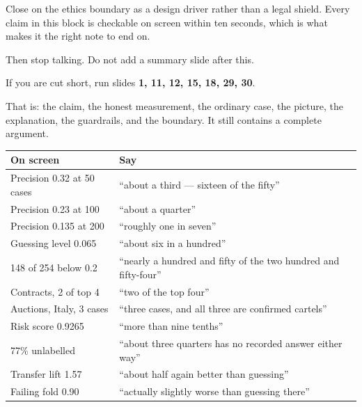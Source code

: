 \documentclass[11pt]{article}
\begin{document}
\begin{means}
Close on the ethics boundary as a design driver rather than a legal shield.
Every claim in this block is checkable on screen within ten seconds, which is
what makes it the right note to end on.

Then stop talking. Do not add a summary slide after this.
\end{means}



If you are cut short, run slides \textbf{1, 11, 12, 15, 18, 29, 30}.

That is: the claim, the honest measurement, the ordinary case, the picture, the
explanation, the guardrails, and the boundary. It still contains a complete
argument.


\begin{center}\small
\begin{tabular}{@{}p{6.2cm}p{8.4cm}@{}}
\hline
\textbf{On screen} & \textbf{Say} \\
\hline
Precision 0.32 at 50 cases & ``about a third --- sixteen of the fifty'' \\
Precision 0.23 at 100 & ``about a quarter'' \\
Precision 0.135 at 200 & ``roughly one in seven'' \\
Guessing level 0.065 & ``about six in a hundred'' \\
148 of 254 below 0.2 & ``nearly a hundred and fifty of the two hundred and
fifty-four'' \\
Contracts, 2 of top 4 & ``two of the top four'' \\
Auctions, Italy, 3 cases & ``three cases, and all three are confirmed
cartels'' \\
Risk score 0.9265 & ``more than nine tenths'' \\
77\% unlabelled & ``about three quarters has no recorded answer either way'' \\
Transfer lift 1.57 & ``about half again better than guessing'' \\
Failing fold 0.90 & ``actually slightly worse than guessing there'' \\
\hline
\end{tabular}
\end{center}
\end{document}
